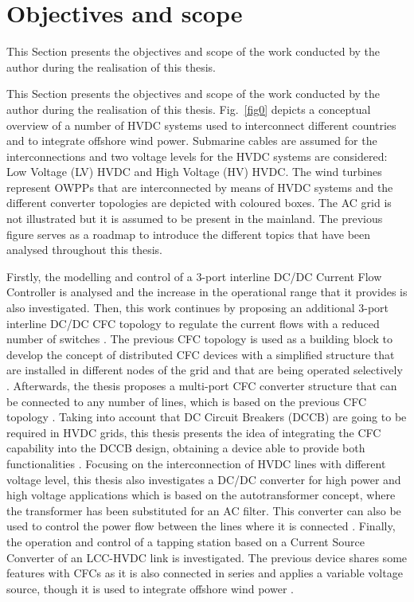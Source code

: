 \newpage 
\section{Objectives and scope}
This Section presents the objectives and scope of the work conducted by the author during the realisation of this thesis. 
	
	
	This Section presents the objectives and scope of the work conducted by the author during the realisation of this thesis. 
	Fig.~\ref{fig0} depicts a conceptual overview of a number of HVDC systems used to interconnect different countries and to integrate offshore wind power. Submarine cables are assumed for the interconnections and two voltage levels for the HVDC systems are considered: Low Voltage (LV) HVDC and High Voltage (HV) HVDC. The wind turbines represent OWPPs that are interconnected by means of HVDC systems and the different converter topologies are depicted with coloured boxes. The AC grid is not illustrated but it is assumed to be present in the mainland. The previous figure serves as a roadmap to introduce the different topics that have been analysed throughout this thesis. 
	
	Firstly, the modelling and control of a 3-port interline DC/DC Current Flow Controller is analysed  and the increase in the operational range that it provides is also investigated. Then, this work continues by proposing an additional 3-port interline DC/DC CFC topology to regulate the current flows with a reduced number of switches . The previous CFC topology is used as a building block to develop the concept of distributed CFC devices with a simplified structure that are installed in different nodes of the grid and that are being operated selectively . Afterwards, the thesis proposes a multi-port CFC converter structure that can be connected to any number of lines, which is based on the previous CFC topology . Taking into account that DC Circuit Breakers (DCCB) are going to be required in HVDC grids, this thesis presents the idea of integrating the CFC capability into the DCCB design, obtaining a device able to provide both functionalities . Focusing on the interconnection of HVDC lines with different voltage level, this thesis also investigates a DC/DC converter for high power and high voltage applications which is based on the autotransformer concept, where the transformer has been substituted for an AC filter. This converter can also be used to control the power flow between the lines where it is connected . Finally, the operation and control of a tapping station based on a Current Source Converter of an LCC-HVDC link is investigated. The previous device shares some features with CFCs as it is also connected in series and applies a variable voltage source, though it is used to integrate offshore wind power .
	

